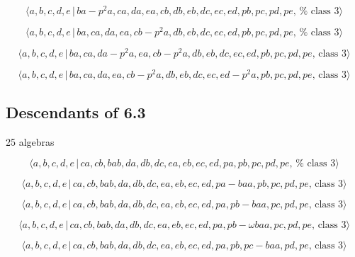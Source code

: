 \documentclass[10pt]{article}
\begin{document}
\begin{equation}
\langle a,b,c,d,e\,|\,ba-p^2a,ca,da,ea,cb,db,eb,dc,ec,ed,pb,pc,pd,pe,\,\text{%
class }3\rangle  \tag{7.4735}
\end{equation}

\begin{equation}
\langle a,b,c,d,e\,|\,ba,ca,da,ea,cb-p^2a,db,eb,dc,ec,ed,pb,pc,pd,pe,\,\text{%
class }3\rangle  \tag{7.4736}
\end{equation}

\begin{equation}
\langle a,b,c,d,e\,|\,ba,ca,da-p^2a,ea,cb-p^2a,db,eb,dc,ec,ed,pb,pc,pd,pe,\,%
\text{class }3\rangle  \tag{7.4737}
\end{equation}

\begin{equation}
\langle a,b,c,d,e\,|\,ba,ca,da,ea,cb-p^2a,db,eb,dc,ec,ed-p^2a,pb,pc,pd,pe,\,%
\text{class }3\rangle  \tag{7.4738}
\end{equation}

\subsection{Descendants of 6.3}

25 algebras

\begin{equation}
\langle a,b,c,d,e\,|\,ca,cb,bab,da,db,dc,ea,eb,ec,ed,pa,pb,pc,pd,pe,\,\text{%
class }3\rangle  \tag{7.4739}
\end{equation}

\begin{equation}
\langle a,b,c,d,e\,|\,ca,cb,bab,da,db,dc,ea,eb,ec,ed,pa-baa,pb,pc,pd,pe,\,%
\text{class }3\rangle  \tag{7.4740}
\end{equation}

\begin{equation}
\langle a,b,c,d,e\,|\,ca,cb,bab,da,db,dc,ea,eb,ec,ed,pa,pb-baa,pc,pd,pe,\,%
\text{class }3\rangle  \tag{7.4741}
\end{equation}

\begin{equation}
\langle a,b,c,d,e\,|\,ca,cb,bab,da,db,dc,ea,eb,ec,ed,pa,pb-\omega
baa,pc,pd,pe,\,\text{class }3\rangle  \tag{7.4742}
\end{equation}

\begin{equation}
\langle a,b,c,d,e\,|\,ca,cb,bab,da,db,dc,ea,eb,ec,ed,pa,pb,pc-baa,pd,pe,\,%
\text{class }3\rangle  \tag{7.4743}
\end{equation}
\end{document}
